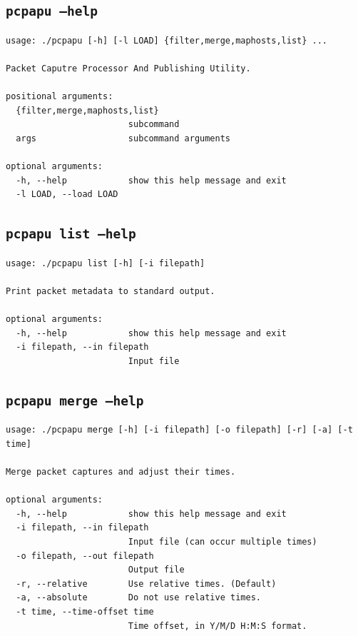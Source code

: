 \documentclass[10pt,a4paper,notitlepage]{report}
\begin{document}
\subsection{\texttt{pcpapu --help}}
\begin{verbatim}
usage: ./pcpapu [-h] [-l LOAD] {filter,merge,maphosts,list} ...

Packet Caputre Processor And Publishing Utility.

positional arguments:
  {filter,merge,maphosts,list}
                        subcommand
  args                  subcommand arguments

optional arguments:
  -h, --help            show this help message and exit
  -l LOAD, --load LOAD
\end{verbatim}

\subsection{\texttt{pcpapu list --help}}
\begin{verbatim}
usage: ./pcpapu list [-h] [-i filepath]

Print packet metadata to standard output.

optional arguments:
  -h, --help            show this help message and exit
  -i filepath, --in filepath
                        Input file
\end{verbatim}

\subsection{\texttt{pcpapu merge --help}}
\begin{verbatim}
usage: ./pcpapu merge [-h] [-i filepath] [-o filepath] [-r] [-a] [-t time]

Merge packet captures and adjust their times.

optional arguments:
  -h, --help            show this help message and exit
  -i filepath, --in filepath
                        Input file (can occur multiple times)
  -o filepath, --out filepath
                        Output file
  -r, --relative        Use relative times. (Default)
  -a, --absolute        Do not use relative times.
  -t time, --time-offset time
                        Time offset, in Y/M/D H:M:S format.
\end{verbatim}
\end{document}
